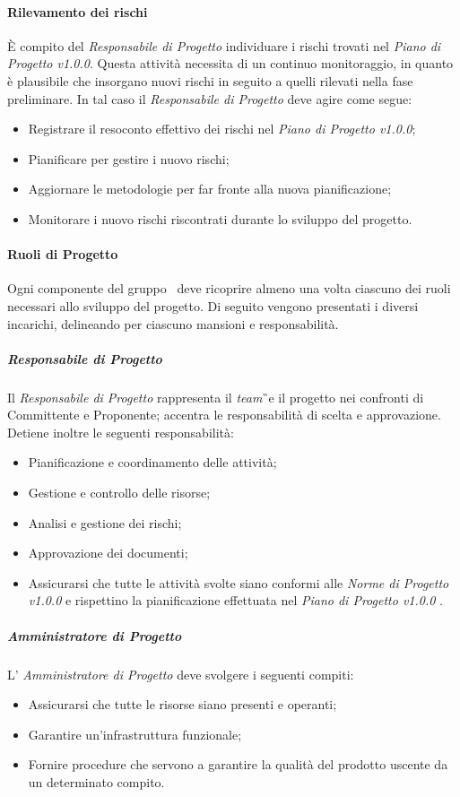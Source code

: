 \paragraph{Rilevamento dei rischi}
È compito del \textit{Responsabile di Progetto} individuare i rischi trovati nel \textit{Piano di Progetto v1.0.0}. Questa attività necessita di un continuo monitoraggio, in quanto è plausibile che insorgano nuovi rischi in seguito a quelli rilevati nella fase preliminare. In tal caso il \textit{Responsabile di Progetto} deve agire come segue:
\begin{itemize}
\item Registrare il resoconto effettivo dei rischi nel \textit{Piano di Progetto v1.0.0};
\item Pianificare per gestire i nuovo rischi;
\item Aggiornare le metodologie per far fronte alla nuova pianificazione;
\item Monitorare i nuovo rischi riscontrati durante lo sviluppo del progetto. 
\end{itemize}

\paragraph{Ruoli di Progetto}
Ogni componente del gruppo \GRUPPO\ deve ricoprire almeno una volta ciascuno dei ruoli necessari allo sviluppo del progetto. Di seguito vengono presentati i diversi incarichi, delineando per ciascuno mansioni e responsabilità.

\subparagraph{Responsabile di Progetto} Il \textit{Responsabile di Progetto} rappresenta il \textit{team}\G\ e il progetto nei confronti di Committente e Proponente; accentra le responsabilità di scelta e approvazione. Detiene inoltre le seguenti responsabilità:
\begin{itemize}
\item Pianificazione e coordinamento delle attività;
\item Gestione e controllo delle risorse;
\item Analisi e gestione dei rischi;
\item Approvazione dei documenti;
\item Assicurarsi che tutte le attività svolte siano conformi alle \textit{Norme di Progetto
v1.0.0} e rispettino la pianificazione effettuata nel \textit{Piano di Progetto v1.0.0} .
\end{itemize}  

\subparagraph{Amministratore di Progetto} L' \textit{Amministratore di Progetto} deve svolgere i seguenti compiti:
\begin{itemize}
\item Assicurarsi che tutte le risorse siano presenti e operanti; 
\item Garantire un'infrastruttura funzionale;
\item Fornire procedure che servono a garantire la qualità del prodotto uscente da un
determinato compito.
\end{itemize}

